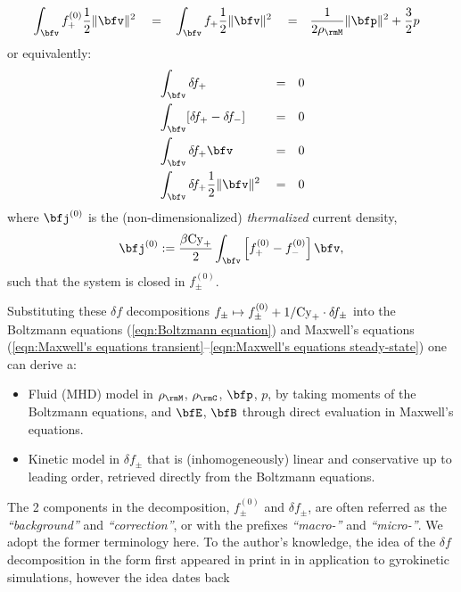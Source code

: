 \begin{definition}
\begin{align}
            &\int_{\bfv}f_{+}^{(0)}\frac{1}{2}\|\bfv\|^{2}      &  &=  &  &\int_{\bfv}f_{+}\frac{1}{2}\|\bfv\|^{2}  &  &=  &  \frac{1}{2\rho_{\rmM}}\|\bfp\|^{2} + \frac{3}{2}&p
        \end{align}
        or equivalently:
        \begin{align}
            &\int_{\bfv}\delta\!f_{+}                         &  &=  &  0  \label{eqn:correction mass moment}  \\
            &\int_{\bfv}[\delta\!f_{+} - \delta\!f_{-}]       &  &=  &  0  \\
            &\int_{\bfv}\delta\!f_{+}\bfv                     &  &=  &  0  \\
            &\int_{\bfv}\delta\!f_{+}\frac{1}{2}\|\bfv\|^{2}  &  &=  &  0  \label{eqn:correction energy moment}
        \end{align}
        where $\bfj^{(0)}$ is the (non-dimensionalized) \emph{thermalized} current density,
        \begin{equation}\label{eqn:thermalized current density}
            \bfj^{(0)}  :=  \frac{\beta\rmCy_{+}}{2}\int_{\bfv}\left[f_{+}^{(0)} - f_{-}^{(0)}\right]\bfv,
        \end{equation}
        such that the system is closed in $f_{\pm}^{(0)}$.

        Substituting these $\delta\!f$ decompositions $f_{\pm}  \mapsto  f_{\pm}^{(0)} + 1/\mathrm{Cy}_{+}\cdot\delta\!f_{\pm}$ into the Boltzmann equations (\ref{eqn:Boltzmann equation}) and Maxwell's equations (\ref{eqn:Maxwell's equations transient}--\ref{eqn:Maxwell's equations steady-state}) one can derive a:
        \begin{itemize}
            \item  Fluid (MHD) model in $\rho_{\rmM}$, $\rho_{\rmC}$, $\bfp$, $p$, by taking moments of the Boltzmann equations, and $\bfE$, $\bfB$ through direct evaluation in Maxwell's equations.
            \item  Kinetic model in $\delta\!f_{\pm}$ that is (inhomogeneously) linear and conservative up to leading order, retrieved directly from the Boltzmann equations.
        \end{itemize}
    \end{definition}
    
    The 2 components in the decomposition, $f_{\pm}^{(0)}$ and $\delta\!f_{\pm}$, are often referred as the \emph{``background''} and \emph{``correction''}, or with the prefixes \emph{``macro-''} and \emph{``micro-''}. We adopt the former terminology here. To the author's knowledge, the idea of the $\delta\!f$ decomposition in the form first appeared in print in \cite{Parker_Lee_1993, Dimits_Lee_1993} in application to gyrokinetic simulations, however the idea dates back

